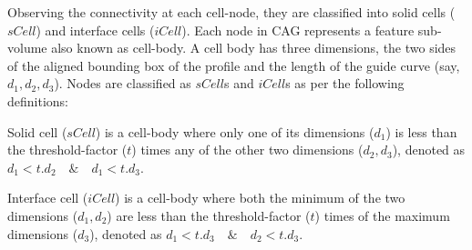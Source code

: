 Observing the connectivity at each cell-node, they are classified into solid cells ($sCell$) and interface cells ($iCell$). %
Each node in CAG represents a feature sub-volume also known as cell-body. A cell body has three dimensions, the two sides of the aligned bounding box of the profile and the length of the guide curve (say, $d_1,d_2,d_3$).
%
Nodes are classified as $sCell$s and $iCell$s as per the following definitions:
\begin{mydef}
\label{def:scell}
Solid cell ($sCell$) is a cell-body where only one of its dimensions ($d_1$) is less than the threshold-factor ($t$) times any of the other two dimensions ($d_2, d_3$), denoted as  $d_1 < t.d_2 \quad \&  \quad d_1 < t.d_3$. %
\end{mydef}
\begin{mydef}
\label{def:icell}
Interface cell ($iCell$) is a cell-body where  both the minimum of the two dimensions ($d_1,d_2$)  are less than the threshold-factor ($t$) times of the maximum dimensions ($d_3$), denoted as  $d_1 < t.d_3 \quad \&  \quad d_2 < t.d_3$. %
\end{mydef}


